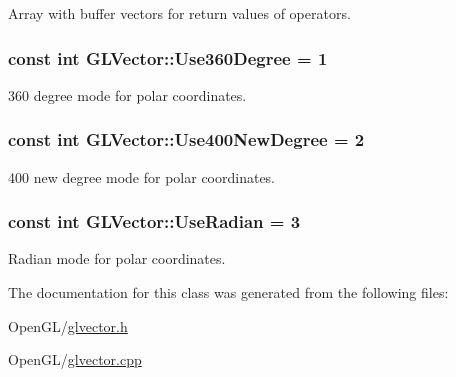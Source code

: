 \label{d4/db1/classGLVector_aa4888b5e8b587095f9ea31991a5c072a}
\-Array with buffer vectors for return values of operators. \hypertarget{classGLVector_abb139fb8951c3eda14b0eb7d74c0504e}{
\subsubsection[{\-Use360\-Degree}]{\setlength{\rightskip}{0pt plus 5cm}const int {\bf \-G\-L\-Vector\-::\-Use360\-Degree} = 1}}
\label{d4/db1/classGLVector_abb139fb8951c3eda14b0eb7d74c0504e}
360 degree mode for polar coordinates. \hypertarget{classGLVector_a4ee1d6d06257b4e5399ad196eb6db536}{
\subsubsection[{\-Use400\-New\-Degree}]{\setlength{\rightskip}{0pt plus 5cm}const int {\bf \-G\-L\-Vector\-::\-Use400\-New\-Degree} = 2}}
\label{d4/db1/classGLVector_a4ee1d6d06257b4e5399ad196eb6db536}
400 new degree mode for polar coordinates. \hypertarget{classGLVector_a8b1fc370c56a13540109b9b6f3d4f5df}{
\subsubsection[{\-Use\-Radian}]{\setlength{\rightskip}{0pt plus 5cm}const int {\bf \-G\-L\-Vector\-::\-Use\-Radian} = 3}}
\label{d4/db1/classGLVector_a8b1fc370c56a13540109b9b6f3d4f5df}
\-Radian mode for polar coordinates. 

\-The documentation for this class was generated from the following files\-:\begin{DoxyCompactItemize}
\item 
\-Open\-G\-L/\hyperlink{glvector_8h}{glvector.\-h}\item 
\-Open\-G\-L/\hyperlink{glvector_8cpp}{glvector.\-cpp}\end{DoxyCompactItemize}
